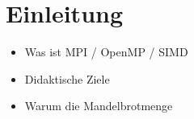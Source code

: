 \section{Einleitung}
\begin{itemize}
	\item Was ist MPI / OpenMP / SIMD
	\item Didaktische Ziele
	\item Warum die Mandelbrotmenge
\end{itemize}
